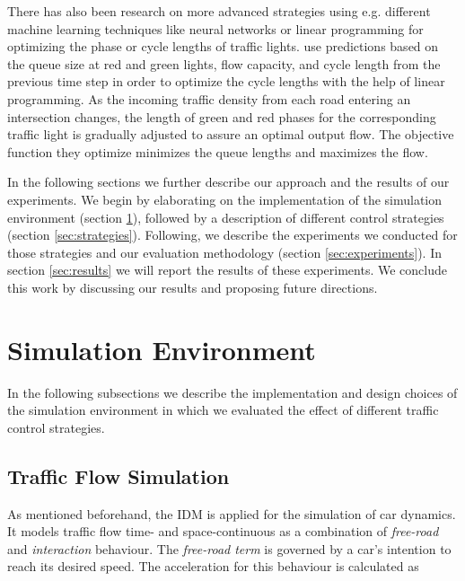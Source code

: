 \documentclass[11pt]{article}
\begin{document}
There has also been research on more advanced strategies using e.g. different machine learning techniques like neural networks \citep[e.g.][]{srinivasan2006neural, chao2008intelligent} or linear programming \citep[e.g.][]{coll2013linear, lin2004enhanced} for optimizing the phase or cycle lengths of traffic lights. \citet[][]{coll2013linear} use predictions based on the queue size at red and green lights, flow capacity, and cycle length from the previous time step in order to optimize the cycle lengths with the help of linear programming. As the incoming traffic density from each road entering an intersection changes, the length of green and red phases for the corresponding traffic light is gradually adjusted to assure an optimal output flow. The objective function they optimize minimizes the queue lengths and maximizes the flow. 

\vspace{20pt}

In the following sections we further describe our approach and the results of our experiments. We begin by elaborating on the implementation of the simulation environment (section \ref{sec:envi}), followed by a description of different control strategies (section \ref{sec:strategies}). Following, we describe the experiments we conducted for those strategies and our evaluation methodology (section \ref{sec:experiments}). In section \ref{sec:results} we will report the results of these experiments. We conclude this work by discussing our results and proposing future directions.
	
\section{Simulation Environment}
\label{sec:envi}
In the following subsections we describe the implementation and design choices of the simulation environment in which we evaluated the effect of different traffic control strategies.
	
\subsection{Traffic Flow Simulation}
As mentioned beforehand, the IDM \citep{treiber2000congested} is applied for the simulation of car dynamics. It models traffic flow time- and space-continuous as a combination of \textit{free-road} and \textit{interaction} behaviour. The \textit{free-road term} is governed by a car's intention to reach its desired speed. The acceleration for this behaviour is calculated \citep{treiber2000congested} as
\end{document}
